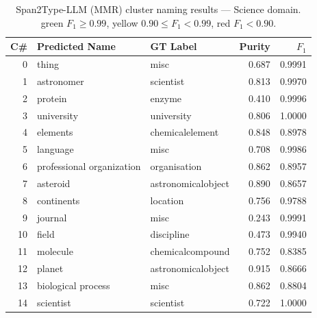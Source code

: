 \documentclass[11pt,a4paper]{article}
\begin{document}
\begin{table}[ht]
\centering
\small
\caption{Span2Type-LLM (MMR) cluster naming results --- Science domain.
\colorbox{green!15}{green} $F_1 \geq 0.99$,
\colorbox{yellow!25}{yellow} $0.90 \leq F_1 < 0.99$,
\colorbox{red!15}{red} $F_1 < 0.90$.}
\label{tab:naming_science}
\setlength{\tabcolsep}{5pt}
\begin{tabular}{r l l r r}
\toprule
\textbf{C\#} & \textbf{Predicted Name} & \textbf{GT Label} & \textbf{Purity} & \textbf{$F_1$} \\
\midrule
   0 & thing                          & misc                   & 0.687 & \cellcolor{green!15}0.9991 \\
   1 & astronomer                     & scientist              & 0.813 & \cellcolor{green!15}0.9970 \\
   2 & protein                        & enzyme                 & 0.410 & \cellcolor{green!15}0.9996 \\
   3 & university                     & university             & 0.806 & \cellcolor{green!15}1.0000 \\
   4 & elements                       & chemicalelement        & 0.848 & \cellcolor{red!15}0.8978 \\
   5 & language                       & misc                   & 0.708 & \cellcolor{green!15}0.9986 \\
   6 & professional organization      & organisation           & 0.862 & \cellcolor{red!15}0.8957 \\
   7 & asteroid                       & astronomicalobject     & 0.890 & \cellcolor{red!15}0.8657 \\
   8 & continents                     & location               & 0.756 & \cellcolor{yellow!25}0.9788 \\
   9 & journal                        & misc                   & 0.243 & \cellcolor{green!15}0.9991 \\
  10 & field                          & discipline             & 0.473 & \cellcolor{green!15}0.9940 \\
  11 & molecule                       & chemicalcompound       & 0.752 & \cellcolor{red!15}0.8385 \\
  12 & planet                         & astronomicalobject     & 0.915 & \cellcolor{red!15}0.8666 \\
  13 & biological process             & misc                   & 0.862 & \cellcolor{red!15}0.8804 \\
  14 & scientist                      & scientist              & 0.722 & \cellcolor{green!15}1.0000 \\

\end{tabular}
\end{table}
\end{document}
